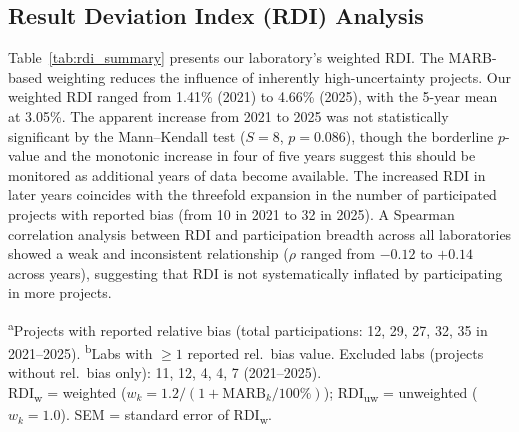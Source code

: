 \documentclass[12pt,a4paper,twoside]{article}
\begin{document}
\subsection{Result Deviation Index (RDI) Analysis}
\label{sec:rdi}

Table~\ref{tab:rdi_summary} presents our laboratory's weighted RDI. The MARB-based weighting reduces the influence of inherently high-uncertainty projects. Our weighted RDI ranged from 1.41\% (2021) to 4.66\% (2025), with the 5-year mean at 3.05\%. The apparent increase from 2021 to 2025 was not statistically significant by the Mann--Kendall test ($S = 8$, $p = 0.086$), though the borderline $p$-value and the monotonic increase in four of five years suggest this should be monitored as additional years of data become available. The increased RDI in later years coincides with the threefold expansion in the number of participated projects with reported bias (from 10 in 2021 to 32 in 2025). A Spearman correlation analysis between RDI and participation breadth across all laboratories showed a weak and inconsistent relationship ($\rho$ ranged from $-0.12$ to $+0.14$ across years), suggesting that RDI is not systematically inflated by participating in more projects.

\begin{table}[H]
\centering
\caption{Result Deviation Index (RDI) of the case-study laboratory compared with all-laboratory benchmarks.}
\label{tab:rdi_summary}
\par\vspace{4pt}\footnotesize
\textsuperscript{a}Projects with reported relative bias (total participations: 12, 29, 27, 32, 35 in 2021--2025).
\textsuperscript{b}Labs with $\geq 1$ reported rel.\ bias value. Excluded labs (projects without rel.\ bias only): 11, 12, 4, 4, 7 (2021--2025).\\
RDI\textsubscript{w} = weighted ($w_k = 1.2/(1+\text{MARB}_k/100\%)$); RDI\textsubscript{uw} = unweighted ($w_k = 1.0$). SEM = standard error of RDI\textsubscript{w}.
\end{table}
\end{document}
